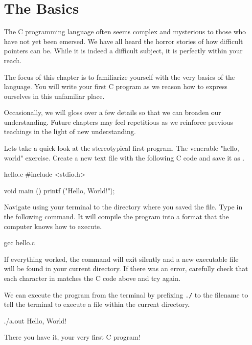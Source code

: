 \chapter{The Basics}

The C programming language often seems complex and mysterious to those who have
not yet been emersed. We have all heard the horror stories of how difficult
pointers can be. While it is indeed a difficult subject, it is perfectly within
your reach.

The focus of this chapter is to familiarize yourself with the very basics of
the language. You will write your first C program as we reason how to express
ourselves in this unfamiliar place.

Occasionally, we will gloss over a few details so that we can broaden our
understanding. Future chapters may feel repetitious as we reinforce previous
teachings in the light of new understanding.

Lets take a quick look at the stereotypical first program. The venerable
"hello, world" exercise. Create a new text file with the following C code and
save it as .

\begin{code}{hello.c}
#include <stdio.h>

void main ()
{
    printf ("Hello, World!\n");
}
\end{code}

Navigate using your terminal to the directory where you saved the file. Type in
the following command. It will compile the program into a format that the
computer knows how to execute.

\begin{Terminal}
gcc hello.c
\end{Terminal}

If everything worked, the  command will exit silently and a new
executable file  will be found in your current directory. If there
was an error, carefully check that each character in  matches the
C code above and try again.

We can execute the program from the terminal by prefixing \verb|./| to the
filename to tell the terminal to execute a file within the current directory.

\begin{Terminal}
./a.out
Hello, World!
\end{Terminal}

There you have it, your very first C program!

